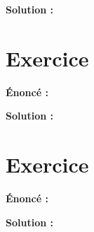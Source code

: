 \documentclass[12pt,french,oneside]{report}
\begin{document}
\begin{spacing}{1.2}
\color{blue}
\medskip\textbf{\large Solution :}


\color{black}


\section{Exercice }

\textbf{\large Énoncé :}



\color{blue}
\medskip\textbf{\large Solution :}



\color{black}


\section{Exercice }

\textbf{\large Énoncé :}



\color{blue}
\medskip\textbf{\large Solution :}


\color{black}

\end{spacing}
\end{document}
